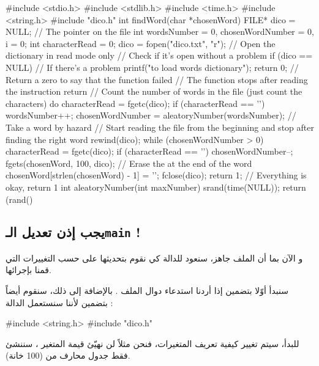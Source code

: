 \begin{Csource}
#include <stdio.h>
#include <stdlib.h>
#include <time.h>
#include <string.h>
#include "dico.h"
int findWord(char *chosenWord)
{
    FILE* dico = NULL; // The pointer on the file
    int wordsNumber = 0, chosenWordNumber = 0, i = 0;
    int characterRead = 0;
    dico = fopen("dico.txt", "r"); // Open the dictionary in read mode only
    // Check if it's open without a problem
    if (dico == NULL) // If there's a problem
    {
        printf("\nImpossible to load words dictionary");
        return 0; // Return a zero to say that the function failed
        // The function stops after reading the instruction return
    }
    // Count the number of words in the file (just count the \n characters)
    do
    {
        characterRead = fgetc(dico);
        if (characterRead == '\n')
            wordsNumber++;
    }
    chosenWordNumber = aleatoryNumber(wordsNumber); // Take a word by hazard
    // Start reading the file from the beginning and stop after finding the right word
    rewind(dico);
    while (chosenWordNumber > 0)
    {
        characterRead = fgetc(dico);
        if (characterRead == '\n')
            chosenWordNumber--;
    }
    fgets(chosenWord, 100, dico);
    // Erase the \n at the end of the word
    chosenWord[strlen(chosenWord) - 1] = '\0';
    fclose(dico);
    return 1; // Everything is okay, return 1
}
int aleatoryNumber(int maxNumber)
{
    srand(time(NULL));
    return (rand() %
}
\end{Csource}

\subsection{يجب إذن تعديل الـ\texttt{main}
!}

و الآن بما أن الملف
جاهز، سنعود للدالة
كي نقوم بتحديثها على حسب التغييرات التي قمنا بإجرائها.

سنبدأ أوّلا بتضمين
إذا أردنا استدعاء دوال الملف
.
بالإضافة إلى ذلك، سنقوم أيضاً بتضمين
لأننا سنستعمل الدالة
 :

\begin{Csource}
#include <string.h>
#include "dico.h"
\end{Csource}

للبدأ، سيتم تغيير كيفية تعريف المتغيرات، فنحن مثلاً لن نهيّئ قيمة المتغير
،
سننشئ فقط جدول محارف من
(100 خانة).

